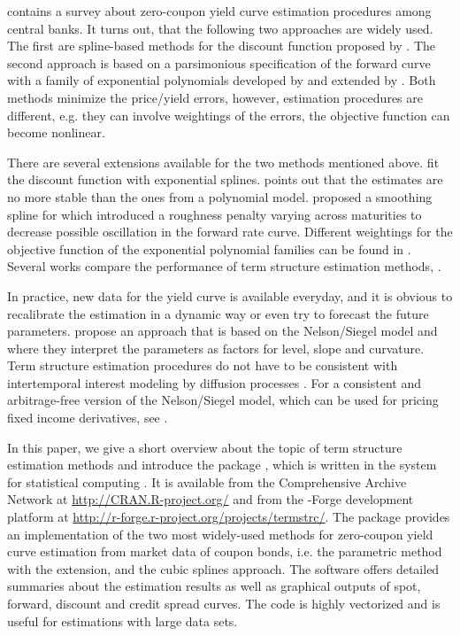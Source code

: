 \cite{BIS2005} contains a survey about zero-coupon yield curve estimation procedures among central banks. It turns out, that the following two approaches are widely used. The first are spline-based methods for the discount function proposed by \cite{McCulloch1971, McCulloch1975}. The second approach is based on a parsimonious specification of the forward curve with a family of exponential polynomials developed by \cite{Nelson1987} and extended by \cite{Svensson1994}. Both methods minimize the price/yield errors, however, estimation procedures are different, e.g. they can involve weightings of the errors, the objective function can become nonlinear.

There are several extensions available for the two methods mentioned above. \cite{Vasicek1982} fit the discount function with exponential splines. \cite{Shea1985} points out that the estimates are no more stable than the ones from a polynomial model. \cite{Fisher1995} proposed a smoothing spline for which \cite{Waggoner1997} introduced a roughness penalty varying across maturities to decrease possible oscillation in the forward rate curve. Different weightings for the objective function of the exponential polynomial families can be found in \cite{Soederlind1997}. Several works compare the performance of term structure estimation methods, \citep[see, e.g.][]{Bliss1997, Bolder1999, Ioannides2003}.

In practice, new data for the yield curve is available everyday, and it is obvious to recalibrate the estimation in a dynamic way or even try to forecast the future parameters. \cite{Diebold2006} propose an approach that is based on the Nelson/Siegel model and where they interpret the parameters as factors for level, slope and curvature. Term structure estimation procedures do not have to be consistent with intertemporal interest modeling by diffusion processes \citep[see, e.g.][]{Bjoerk1999, Filipovic1999}. For a consistent and arbitrage-free version of the Nelson/Siegel model, which can be used for pricing fixed income derivatives, see \cite{Christensen2007}.   

In this paper, we give a short overview about the topic of term structure estimation methods and introduce the package , which is written in the  system for statistical computing \citep{R2008}. It is available from the Comprehensive  Archive Network at \url{http://CRAN.R-project.org/} and from the -Forge development platform at \url{http://r-forge.r-project.org/projects/termstrc/}. The package provides an implementation of the two most widely-used methods for zero-coupon yield curve estimation from market data of coupon bonds, i.e. the parametric \cite{Nelson1987} method with the \cite{Svensson1994} extension, and the \cite{McCulloch1975} cubic splines approach. The software offers detailed summaries about the estimation results as well as graphical outputs of spot, forward, discount and credit spread curves. The code is highly vectorized and is useful for estimations with large data sets.

